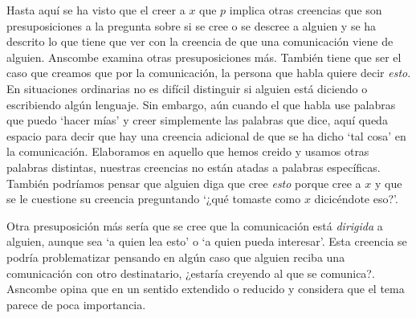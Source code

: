 Hasta aquí se ha visto que el creer a $x$ que $p$ implica otras creencias que
son presuposiciones a la pregunta sobre si se cree o se descree a alguien y se
ha descrito lo que tiene que ver con la creencia de que una comunicación viene
de alguien. Anscombe examina otras presuposiciones más. También tiene que ser el
caso que creamos que por la comunicación, la persona que habla quiere decir
\emph{esto}. En situaciones ordinarias no es difícil distinguir si alguien está
diciendo o escribiendo algún lenguaje. Sin embargo, aún cuando el que habla use
palabras que puedo `hacer mías' y creer simplemente las palabras que dice, aquí
queda espacio para decir que hay una creencia adicional de que se ha dicho `tal
cosa' en la comunicación. Elaboramos en aquello que hemos creido y usamos otras
palabras distintas, nuestras creencias no están atadas a palabras específicas.
También podríamos pensar que alguien diga que cree \emph{esto} porque cree a $x$
y que se le cuestione su creencia preguntando `¿qué tomaste como $x$ dicicéndote
eso?'\autocite[Cf.~][8]{anscombe2008faith:tobelieve}.

Otra presuposición más sería que se cree que la comunicación está
\emph{dirigida} a alguien, aunque sea `a quien lea esto' o `a quien pueda
interesar'. Esta creencia se podría problematizar pensando en algún caso que
alguien reciba una comunicación con otro destinatario, ¿estaría creyendo al que
se comunica?. Asncombe opina que en un sentido extendido o reducido y considera
que el tema parece de poca
importancia\autocite[Cf.~][7]{anscombe2008faith:tobelieve}.

